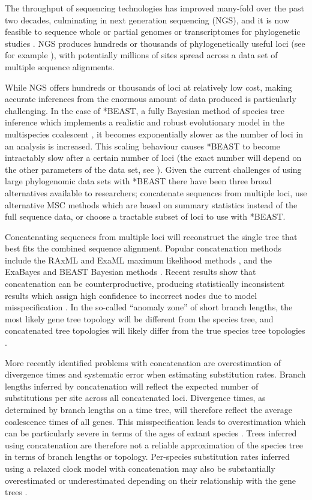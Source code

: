 \documentclass[12pt]{article}
\begin{document}
The throughput of sequencing technologies has improved many-fold over the past
two decades, culminating in next generation sequencing (NGS), and it is now
feasible to sequence whole or partial genomes or transcriptomes for phylogenetic
studies \citep{annurev-ecolsys-110512-135822}. NGS produces hundreds or
thousands of phylogenetically useful loci (see for example \cite{Blom056085}),
with potentially millions of sites spread across a data set of multiple
sequence alignments.

While NGS offers hundreds or thousands of loci at relatively low cost, making
accurate inferences from the enormous amount of data produced is particularly
challenging. In the case of *BEAST, a fully Bayesian method of species tree
inference which implements a realistic and robust evolutionary model in the
multispecies coalescent \citep[MSC;][]{Degnan2009332}, it becomes exponentially
slower as the number of loci in an analysis is increased. This scaling behaviour
causes *BEAST to become intractably slow after a certain number of loci (the
exact number will depend on the other parameters of the data set, see
\cite{Ogilvie01052016}). Given the current challenges of using large
phylogenomic data sets with *BEAST there have been three broad alternatives
available to researchers; concatenate sequences from multiple loci, use
alternative MSC methods which are based on summary statistics instead of the
full sequence data, or choose a tractable subset of loci to use with *BEAST.

Concatenating sequences from multiple loci will reconstruct the single tree that
best fits the combined sequence alignment. Popular concatenation methods include
the RAxML and ExaML maximum likelihood methods \citep{Stamatakis01052014,
Kozlov01082015}, and the ExaBayes and BEAST Bayesian methods
\citep{Aberer01102014, Drummond2007}. Recent results show that concatenation
can be counterproductive, producing statistically inconsistent results which assign
high confidence to incorrect nodes due to model misspecification
\citep{NYAS:NYAS12747}. In the so-called ``anomaly zone'' of short branch
lengths, the most likely gene tree topology will be different from the species
tree, and concatenated tree topologies will likely differ from the true species
tree topologies \citep{journal.pgen.0020068, Kubatko01022007}.

More recently identified problems with concatenation are overestimation of
divergence times and systematic error when estimating substitution rates. Branch lengths
inferred by concatenation will reflect the expected number of substitutions per
site across all concatenated loci. Divergence times, as determined by branch
lengths on a time tree, will therefore reflect the average coalescence times of
all genes. This misspecification leads to overestimation which can be
particularly severe in terms of the ages of extant species
\citep{Ogilvie01052016}. Trees inferred using concatenation are therefore not a
reliable approximation of the species tree in terms of branch lengths or
topology. Per-species substitution rates inferred using a relaxed clock model
with concatenation may also be substantially overestimated or underestimated
depending on their relationship with the gene trees \citep{Mendes28022016}.
\end{document}
